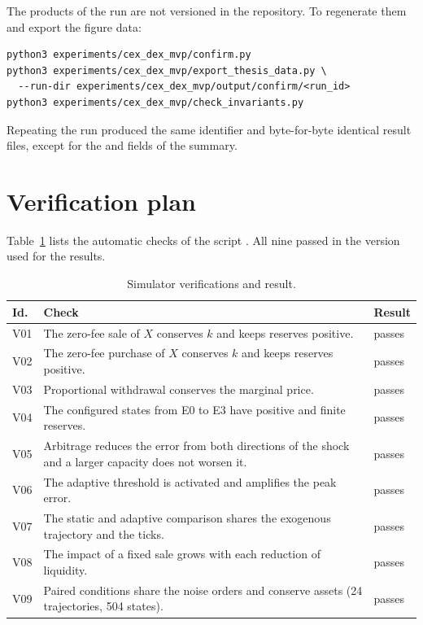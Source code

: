 The products of the run are not versioned in the repository. To regenerate them and export the figure data:

\begin{verbatim}
python3 experiments/cex_dex_mvp/confirm.py
python3 experiments/cex_dex_mvp/export_thesis_data.py \
  --run-dir experiments/cex_dex_mvp/output/confirm/<run_id>
python3 experiments/cex_dex_mvp/check_invariants.py
\end{verbatim}

Repeating the run produced the same identifier and byte-for-byte identical result files, except for the  and  fields of the summary.

\section{Verification plan}
\label{sec:verificacion}

Table~\ref{tab:verificacion} lists the automatic checks of the script . All nine passed in the version used for the results.

\begin{table}[htbp]
\centering
\caption{Simulator verifications and result.}
\label{tab:verificacion}
\small
\begin{tabularx}{\textwidth}{@{}l X l@{}}
\toprule
Id. & Check & Result \\
\midrule
V01 & The zero-fee sale of $X$ conserves $k$ and keeps reserves positive. & passes \\
V02 & The zero-fee purchase of $X$ conserves $k$ and keeps reserves positive. & passes \\
V03 & Proportional withdrawal conserves the marginal price. & passes \\
V04 & The configured states from E0 to E3 have positive and finite reserves. & passes \\
V05 & Arbitrage reduces the error from both directions of the shock and a larger capacity does not worsen it. & passes \\
V06 & The adaptive threshold is activated and amplifies the peak error. & passes \\
V07 & The static and adaptive comparison shares the exogenous trajectory and the ticks. & passes \\
V08 & The impact of a fixed sale grows with each reduction of liquidity. & passes \\
V09 & Paired conditions share the noise orders and conserve assets (24 trajectories, 504 states). & passes \\
\bottomrule
\end{tabularx}
\end{table}

